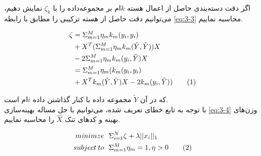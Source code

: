 \documentclass[12pt,twocolumn]{article}
\newcommand\numberthis[1][]{%
    \refstepcounter{equation}%
    \ifx#1\empty\else\label{eq:#1}\fi%
    \tag{\theequation}%
}
\begin{document}
اگر دقت دسته‌بندی حاصل از اعمال هسته $k$ام بر مجموعه‌داده را با $\zeta_k$ نمایش دهیم، می‌توانیم دقت حاصل از هسته ترکیبی را مطابق با رابطه  \eqref{eq:3-3} محاسبه نماییم.

\begin{align*}
\zeta &=  \Sigma_{m = 1}^M \eta_mk_m(y_i,y_i) \\
&+ X^T( \Sigma_{m = 1}^M \eta_mk_m(\tilde{Y},\tilde{Y})) X \\
&- 2  \Sigma_{m = 1}^M \eta_mk_m(y_i,\tilde{Y}) X \\
&=  \Sigma_{m = 1}^M \eta_m(k_m(y_i,y_i) \\
&+ X^Tk_m(\tilde{Y},\tilde{Y})X - 2 k_m(y_i,\tilde{Y}) )
\numberthis
\label{eq:3-3}
\end{align*}

که در آن $\tilde{Y}$ مجموعه داده با کنار گذاشتن داده $i$ام است.
\\
با توجه به تابع خطای تعریف شده‌، می‌توانیم با حل مساله بهینه‌سازی \eqref{eq:3-4} وزن‌های بهینه و کدهای تنک $\hat{X}$ را محاسبه نماییم.

\begin{align*}
minimze& \>\>\> \Sigma_{i=1}^N \zeta + \lambda||x_i||_1 \\
subject \> to& \>\>\> \Sigma_{m=1}^M \eta_m = 1 , \eta > 0
\numberthis
\label{eq:3-4}
\end{align*}
\end{document}
